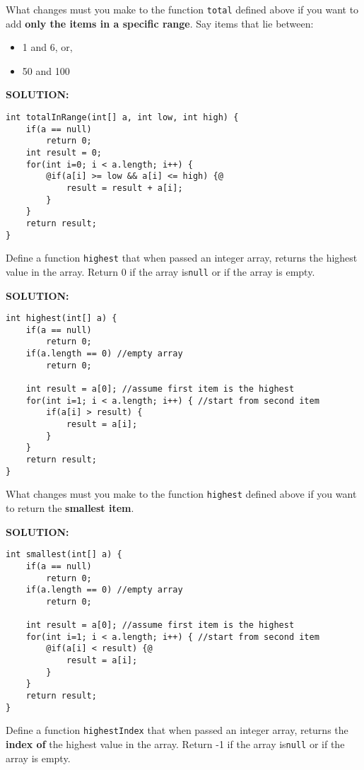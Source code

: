 \documentclass[11pt]{exam}
\begin{document}
\begin{questions}
\question What changes must you make to the function \texttt{total} defined above if you want to add \textbf{only the items in a specific range}. Say items that lie between:

\begin{itemize}
\item 1 and 6, or, 
\item 50 and 100
\end{itemize}

\ifprintanswers \vskip 1cm \textbf{SOLUTION:} \vskip 1cm
\begin{lstlisting}[numbers=none, frame=single ,style=buggy]
int totalInRange(int[] a, int low, int high) {
	if(a == null)
		return 0;
	int result = 0;
	for(int i=0; i < a.length; i++) {
		@if(a[i] >= low && a[i] <= high) {@
			result = result + a[i];
		}
	}
	return result;
}	
\end{lstlisting}
\newpage \else
\newpage
\fi

\question Define a function \texttt{highest} that when passed an integer array, returns the highest value in the array. Return 0 if the array is\texttt{null} or if the array is empty.

\ifprintanswers \vskip 1cm \textbf{SOLUTION:} \vskip 1cm
\begin{lstlisting}[numbers=none, frame=single ,style=buggy]
int highest(int[] a) {
	if(a == null)
		return 0;
	if(a.length == 0) //empty array
		return 0;
		
	int result = a[0]; //assume first item is the highest
	for(int i=1; i < a.length; i++) { //start from second item
		if(a[i] > result) {
			result = a[i];
		}
	}
	return result;
}	
\end{lstlisting}
\newpage \else
\vskip 10cm
\fi

\question What changes must you make to the function \texttt{highest} defined above if you want to return the \textbf{smallest item}.

\ifprintanswers \vskip 1cm \textbf{SOLUTION:} \vskip 1cm
\begin{lstlisting}[numbers=none, frame=single ,style=buggy]
int smallest(int[] a) {
	if(a == null)
		return 0;
	if(a.length == 0) //empty array
		return 0;
		
	int result = a[0]; //assume first item is the highest
	for(int i=1; i < a.length; i++) { //start from second item
		@if(a[i] < result) {@
			result = a[i];
		}
	}
	return result;
}	
\end{lstlisting}
\newpage \else
\newpage
\fi

\question Define a function \texttt{highestIndex} that when passed an integer array, returns the \textbf{index of} the highest value in the array. Return -1 if the array is\texttt{null} or if the array is empty.


\end{questions}
\end{document}
